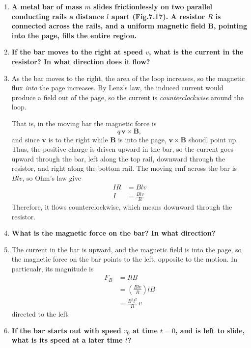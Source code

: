 \documentclass[12pt]{article}
\begin{document}
\begin{enumerate}
  \item[P7.7] \textbf{A metal bar of mass $m$ slides frictionlessly on two parallel conducting rails a distance $l$ apart (Fig.7.17). A resistor $R$ is connected across the rails, and a uniform magnetic field $\mathbf{B}$, pointing into the page, fills the entire region.}
\item[(a)] \textbf{If the bar moves to the right at speed $v$, what is the current in the resistor? In what direction does it flow?}

\item[Solution]
As the bar moves to the right, the area of the loop increases, so the magnetic flux \emph{into} the page increases. By Lenz's law, the induced current would produce a field out of the page, so the current is \emph{counterclockwise} around the loop.

That is, in the moving bar the magnetic force is
\[
q\,\mathbf v\times \mathbf B,
\]
and since $\mathbf v$ is to the right while $\mathbf B$ is into the page, $\mathbf v\times \mathbf B$ shoudl point up. Thus, the positive charge is driven upward in the bar, so the current goes upward through the bar, left along the top rail, downward through the resistor, and right along the bottom rail. The moving emf across the bar is $Blv$, so Ohm's law give
\[
\begin{aligned}
IR&=Blv\\
I&=\frac{Blv}{R}
\end{aligned}
\]
Therefore, it flows counterclockwise, which means downward through the resistor.

\item[(b)] \textbf{What is the magnetic force on the bar? In what direction?}

\item[Solution]
The current in the bar is upward, and the magnetic field is into the page, so the magnetic force on the bar points to the left, opposite to the motion. In particualr, its magnitude is
\[
\begin{aligned}
F_B&=IlB\\
&=\left(\frac{Blv}{R}\right)lB\\
&=\frac{B^2l^2}{R}\,v
\end{aligned}
\]
directed to the left.

\item[(c)] \textbf{If the bar starts out with speed $v_0$ at time $t=0$, and is left to slide, what is its speed at a later time $t$?}


\end{enumerate}
\end{document}
